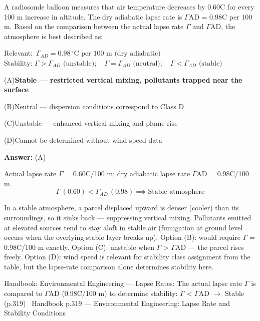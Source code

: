 \documentclass[11pt]{article}
\newcommand{\correct}[1]{\textbf{#1}\;{\color{accent}$\checkmark$}}
\newcommand{\optline}[2]{\par\noindent\hspace{1.2em}(#1)\hspace{0.6em}#2}
\begin{document}
A radiosonde balloon measures that air temperature decreases by 0.60\textdegree{}C for every 100 m increase in altitude. The dry adiabatic lapse rate is $\Gamma$AD = 0.98\textdegree{}C per 100 m. Based on the comparison between the actual lapse rate $\Gamma$ and $\Gamma$AD, the atmosphere is best described as:\par\vspace{3pt}
{\small\color{soft}Relevant:}\ $\Gamma_{AD} = 0.98\,^\circ\text{C per 100 m (dry adiabatic)}$ \quad $\text{Stability: }\Gamma > \Gamma_{AD}\text{ (unstable)};\quad\Gamma = \Gamma_{AD}\text{ (neutral)};\quad\Gamma < \Gamma_{AD}\text{ (stable)}$\par\vspace{3pt}
\optline{A}{\correct{Stable --- restricted vertical mixing, pollutants trapped near the surface}}
\optline{B}{Neutral --- dispersion conditions correspond to Class D}
\optline{C}{Unstable --- enhanced vertical mixing and plume rise}
\optline{D}{Cannot be determined without wind speed data}
\par\vspace{3pt}
\vspace{2pt}\par\noindent\colorbox{boxbg}{\parbox{\dimexpr\linewidth-2\fboxsep\relax}{%
\vspace{2pt}\textbf{Answer:} (A)\par\vspace{2pt}
{\small Actual lapse rate $\Gamma$ = 0.60\textdegree{}C/100 m; dry adiabatic lapse rate $\Gamma$AD = 0.98\textdegree{}C/100 m.
\[\Gamma\,(0.60) < \Gamma_{AD}\,(0.98) \implies \text{Stable atmosphere}\]

In a stable atmosphere, a parcel displaced upward is denser (cooler) than its surroundings, so it sinks back --- suppressing vertical mixing. Pollutants emitted at elevated sources tend to stay aloft in stable air (fumigation at ground level occurs when the overlying stable layer breaks up). Option (B): would require $\Gamma$ = 0.98\textdegree{}C/100 m exactly. Option (C): unstable when $\Gamma$ > $\Gamma$AD --- the parcel rises freely. Option (D): wind speed is relevant for stability class assignment from the table, but the lapse-rate comparison alone determines stability here.}\par\vspace{2pt}
{\footnotesize\color{soft}Handbook: Environmental Engineering --- Lapse Rates: The actual lapse rate $\Gamma$ is compared to $\Gamma$AD (0.98\textdegree{}C/100 m) to determine stability: $\Gamma$ < $\Gamma$AD $\rightarrow$ Stable (p.319) \textbullet\ Handbook p.319 --- Environmental Engineering: Lapse Rate and Stability Conditions}\vspace{2pt}
}}
\end{document}

